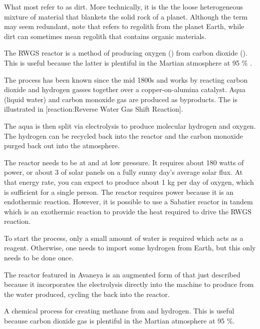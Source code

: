 What most refer to as dirt. More technically, it is the the loose heterogeneous mixture of material that blankets the solid rock of a planet. Although the term may seem redundant, note that  refers to regolith from the planet Earth, while dirt can sometimes mean regolith that contains organic materials.

The RWGS reactor is a method of producing oxygen () from carbon dioxide (). This is useful because the latter is plentiful in the Martian atmosphere at 95 \% .

\startformula
{}
\stopformula

The process has been known since the mid 1800s and works by reacting carbon dioxide and hydrogen gasses together over a copper-on-alumina catalyst. Aqua (liquid water) and carbon monoxide gas are produced as byproducts. The is illustrated in [reaction:Reverse Water Gas Shift Reaction].

The aqua is then split via electrolysis to produce molecular hydrogen and oxygen. The hydrogen can be recycled back into the reactor and the carbon monoxide purged back out into the atmosphere.

The reactor needs to be at  and at low pressure. It requires about 180 watts of power, or about 3  of solar panels on a fully sunny day's average solar flux. At that energy rate, you can expect to produce about 1 kg per day of oxygen, which is sufficient for a single person. The reactor requires power because it is an endothermic reaction. However, it is possible to use a Sabatier reactor in tandem which is an exothermic reaction to provide the heat required to drive the RWGS reaction.

To start the process, only a small amount of water is required which acts as a reagent. Otherwise, one needs to import some hydrogen from Earth, but this only needs to be done once.

The reactor featured in Avaneya is an augmented form of that just described because it incorporates the electrolysis directly into the machine to produce  from the water produced, cycling the  back into the reactor.

A chemical process for creating methane  from  and hydrogen. This is useful because carbon dioxide gas is plentiful in the Martian atmosphere at 95 \%.

